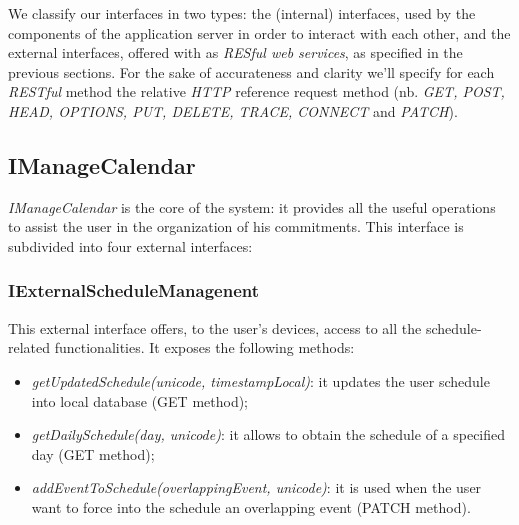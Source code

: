 We classify our interfaces in two types: the (internal) interfaces, used by the components of the application server in order to interact with each other, and the external interfaces, offered with as \textit{RESful web services}, as specified in the previous sections. For the sake of accurateness and clarity we'll specify for each \textit{RESTful} method the relative \textit{HTTP} reference request method (nb. \textit{GET, POST, HEAD, OPTIONS, PUT, DELETE, TRACE, CONNECT } and \textit{PATCH}).
\subsection{IManageCalendar}
\label{subsect: IManageCalendar}
\textit{IManageCalendar} is the core of the system: it provides all the useful operations to assist the user in the organization of his commitments. This interface is subdivided into four external interfaces:

\subsubsection{IExternalScheduleManagenent}
This external interface offers, to the user's devices, access to all the schedule-related functionalities. It exposes the following methods:
\begin{itemize}
\item \textit{getUpdatedSchedule(unicode, timestampLocal)}: it updates the user schedule into local database (GET method);
\item \textit{getDailySchedule(day, unicode)}: it allows to obtain the schedule of a specified day (GET method);
\item \textit{addEventToSchedule(overlappingEvent, unicode)}: it is used when the user want to force into the schedule an overlapping event (PATCH method). 
\end{itemize}

